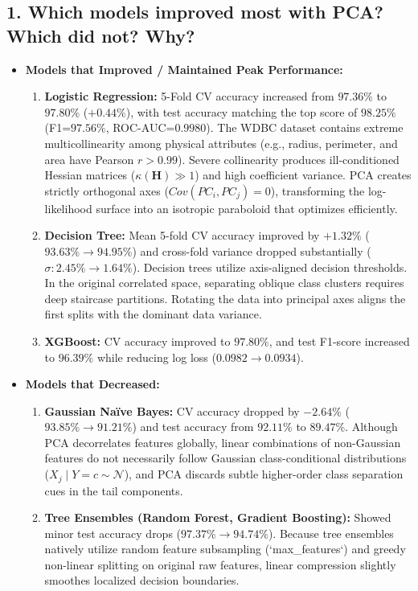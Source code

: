\documentclass[12pt,a4paper]{article}
\begin{document}
\subsection{1. Which models improved most with PCA? Which did not? Why?}
\begin{itemize}
\item \textbf{Models that Improved / Maintained Peak Performance:}
\begin{enumerate}
\item \textbf{Logistic Regression:} 5-Fold CV accuracy increased from $97.36\%$ to \textbf{$97.80\%$} ($+0.44\%$), with test accuracy matching the top score of \textbf{$98.25\%$} (F1=\textbf{$97.56\%$}, ROC-AUC=\textbf{$0.9980$}). The WDBC dataset contains extreme multicollinearity among physical attributes (e.g., radius, perimeter, and area have Pearson $r > 0.99$). Severe collinearity produces ill-conditioned Hessian matrices ($\kappa(\mathbf{H}) \gg 1$) and high coefficient variance. PCA creates strictly orthogonal axes ($Cov(PC_i, PC_j) = 0$), transforming the log-likelihood surface into an isotropic paraboloid that optimizes efficiently.
\item \textbf{Decision Tree:} Mean 5-fold CV accuracy improved by $+1.32\%$ ($93.63\% \to \mathbf{94.95\%}$) and cross-fold variance dropped substantially ($\sigma: 2.45\% \to 1.64\%$). Decision trees utilize axis-aligned decision thresholds. In the original correlated space, separating oblique class clusters requires deep staircase partitions. Rotating the data into principal axes aligns the first splits with the dominant data variance.
\item \textbf{XGBoost:} CV accuracy improved to \textbf{$97.80\%$}, and test F1-score increased to \textbf{$96.39\%$} while reducing log loss ($0.0982 \to 0.0934$).
\end{enumerate}
\item \textbf{Models that Decreased:}
\begin{enumerate}
\item \textbf{Gaussian Naïve Bayes:} CV accuracy dropped by $-2.64\%$ ($93.85\% \to 91.21\%$) and test accuracy from $92.11\%$ to $89.47\%$. Although PCA decorrelates features globally, linear combinations of non-Gaussian features do not necessarily follow Gaussian class-conditional distributions ($X_j \mid Y=c \sim \mathcal{N}$), and PCA discards subtle higher-order class separation cues in the tail components.
\item \textbf{Tree Ensembles (Random Forest, Gradient Boosting):} Showed minor test accuracy drops ($97.37\% \to 94.74\%$). Because tree ensembles natively utilize random feature subsampling (`max\_features`) and greedy non-linear splitting on original raw features, linear compression slightly smoothes localized decision boundaries.
\end{enumerate}
\end{itemize}
\end{document}
